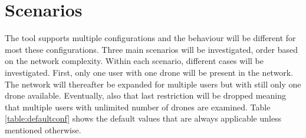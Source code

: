 \chapter{Scenarios}
\label{chap:scenarios}
The tool supports multiple configurations and the behaviour will be different for most these configurations. Three main scenarios 
will be investigated, order based on the network complexity. Within each scenario, different cases will be investigated.
First, only one user with one drone will be present in the network. The network will thereafter be expanded
for multiple users but with still only one drone available. Eventually, also that last restriction will be dropped meaning 
that multiple users with unlimited number of drones are examined. 
Table \ref{table:defaultconf} shows the default values that are always applicable unless mentioned otherwise.

